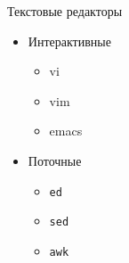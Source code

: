 \begin{frame}{Текстовые редакторы}
	\begin{itemize}
		\item Интерактивные
			\begin{itemize}
				\item vi
				\item vim
				\item emacs
			\end{itemize}
		\item Поточные
			\begin{itemize}
				\item {\tt ed}
				\item {\tt sed}
				\item {\tt awk}
			\end{itemize}
	\end{itemize}
\end{frame}


